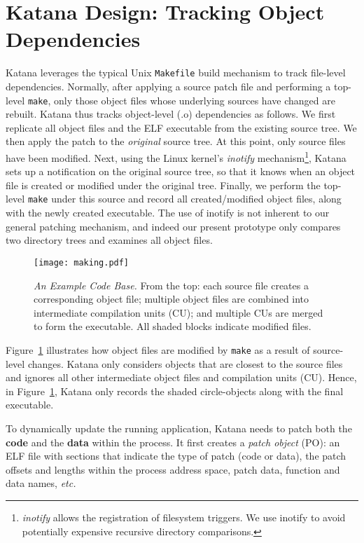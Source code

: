 \section{Katana Design: Tracking Object Dependencies}
\label{sec:design}

Katana leverages the typical Unix {\tt Makefile} build mechanism to track
file-level dependencies.  Normally, after applying a source patch file
and performing a top-level {\tt make}, only those object files whose
underlying sources have changed are rebuilt.  Katana thus tracks
object-level (.o) dependencies as follows.  We first replicate all
object files and the ELF executable from the existing source tree.  We
then apply the patch to the {\it original} source tree.  At this
point, only source files have been modified. Next, using the Linux
kernel's {\it inotify} mechanism\footnote{{\it inotify} allows the
  registration of filesystem triggers. We use inotify to avoid potentially
  expensive recursive directory comparisons.}, Katana sets up a notification
on the original source tree, so that it knows when an object file is
created or modified under the original tree.  Finally, we perform the
top-level {\tt make} under this source and record all created/modified
object files, along with the newly created executable. The use of
inotify is not inherent to our general patching mechanism, and indeed
our present prototype only compares two directory trees and examines
all object files.

\begin{figure}[ht]
\begin{center}
\texttt{[image: making.pdf]}
\end{center}
\caption{{\small {\it An Example Code Base.} From the top: each source
    file creates a corresponding object file; multiple object files
    are combined into intermediate compilation units (CU); and
    multiple CUs are merged to form the executable. All shaded blocks
    indicate modified files.}}
\label{fig:making}
\end{figure}

Figure~\ref{fig:making} illustrates how object files are modified by
{\tt make} as a result of source-level changes.  Katana only considers
objects that are closest to the source files and ignores all other
intermediate object files and compilation units (CU).  Hence, in
Figure~\ref{fig:making}, Katana only records the shaded circle-objects
along with the final executable.

To dynamically update the running application, Katana needs to patch
both the {\bf code} and the {\bf data} within the process.  It first
creates a {\it patch object} (PO): an ELF file with sections that
indicate the type of patch (code or data), the patch offsets and
lengths within the process address space, patch data, function and
data names, {\it etc.} 
